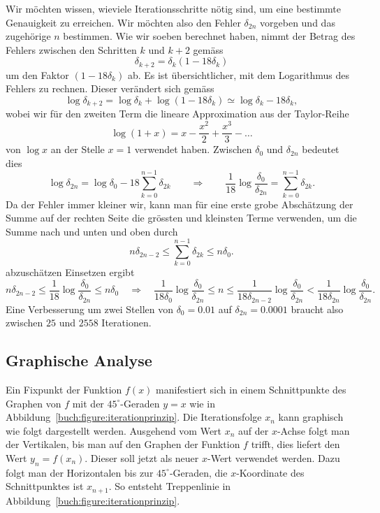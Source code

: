 \begin{beispiel}
Wir möchten wissen, wieviele Iterationsschritte nötig sind, um eine
bestimmte Genauigkeit zu erreichen.
Wir möchten also den Fehler $\delta_{2n}$ vorgeben und das zugehörige
$n$ bestimmen.
Wie wir soeben berechnet haben, nimmt der Betrag des Fehlers zwischen
den Schritten $k$ und $k+2$ gemäss
\[
\delta_{k+2} = \delta_{k} (1-18\delta_k)
\]
um den Faktor $(1-18\delta_k)$ ab.
Es ist übersichtlicher, mit dem Logarithmus des Fehlers zu rechnen.
Dieser verändert sich gemäss
\[
\log \delta_{k+2}
=
\log \delta_{k} + \log(1-18\delta_k)
\simeq
\log\delta_k - 18\delta_k,
\]
wobei wir für den zweiten Term die lineare Approximation aus der
Taylor-Reihe
\[
\log (1+x) = x - \frac{x^2}2 + \frac{x^3}3 -\dots
\]
von 
$\log x $ an der Stelle $x=1$ verwendet haben.
Zwischen $\delta_0$ und $\delta_{2n}$ bedeutet dies
\[
\log\delta_{2n}
=
\log\delta_0
-18
\sum_{k=0}^{n-1} \delta_{2k}
\qquad\Rightarrow\qquad
\frac1{18}
\log\frac{\delta_0}{\delta_{2n}}
=
\sum_{k=0}^{n-1}\delta_{2k}.
\]
Da der Fehler immer kleiner wir, kann man für eine erste grobe Abschätzung
der Summe auf der rechten Seite die grössten und kleinsten Terme
verwenden, um die Summe nach und unten und oben durch
\[
n\delta_{2n-2}
\le
\sum_{k=0}^{n-1}\delta_{2k}
\le
n\delta_0.
\]
abzuschätzen
Einsetzen ergibt
\[
n\delta_{2n-2}
\le
\frac{1}{18}
\log\frac{\delta_{0}}{\delta_{2n}}
\le
n\delta_0
\quad\Rightarrow\quad
\frac{1}{18\delta_0}
\log\frac{\delta_{0}}{\delta_{2n}}
\le
n
\le
\frac{1}{18\delta_{2n-2}}
\log\frac{\delta_{0}}{\delta_{2n}}
<
\frac{1}{18\delta_{2n}}
\log\frac{\delta_{0}}{\delta_{2n}}.
\]
Eine Verbesserung um zwei Stellen von $\delta_0=0.01$ auf $\delta_{2n}=0.0001$
braucht also zwischen $25$ und $2558$ Iterationen.
\end{beispiel}

%
%
\subsection{Graphische Analyse
\label{buch:section:graphischeanalyse}}
Ein Fixpunkt der Funktion $f(x)$ manifestiert sich in einem 
Schnittpunkte des Graphen von $f$ mit der $45^\circ$-Geraden
$y=x$ wie in Abbildung~\ref{buch:figure:iterationprinzip}.
Die Iterationsfolge $x_n$ kann graphisch wie folgt dargestellt
werden.
Ausgehend vom Wert $x_n$ auf der $x$-Achse folgt man der Vertikalen,
bis man auf den Graphen der Funktion $f$ trifft, dies liefert den
Wert $y_n=f(x_n)$.
Dieser soll jetzt als neuer $x$-Wert verwendet werden.
Dazu folgt man der Horizontalen bis zur $45^\circ$-Geraden,
die $x$-Koordinate des Schnittpunktes ist $x_{n+1}$.
So entsteht Treppenlinie in Abbildung~\ref{buch:figure:iterationprinzip}.

